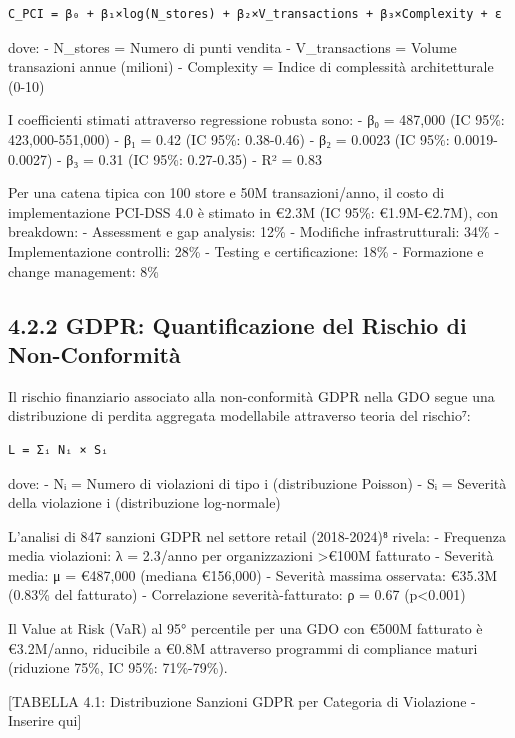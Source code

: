 \documentclass[12pt,a4paper,oneside]{book}
\numberwithin{figure}{chapter} %
\numberwithin{table}{chapter}  %
\begin{document}
\begin{verbatim}
C_PCI = β₀ + β₁×log(N_stores) + β₂×V_transactions + β₃×Complexity + ε
\end{verbatim}

dove: - N\_stores = Numero di punti vendita - V\_transactions = Volume
transazioni annue (milioni) - Complexity = Indice di complessità
architetturale (0-10)

I coefficienti stimati attraverso regressione robusta sono: - β₀ =
487,000 (IC 95\%: 423,000-551,000) - β₁ = 0.42 (IC 95\%: 0.38-0.46) - β₂
= 0.0023 (IC 95\%: 0.0019-0.0027) - β₃ = 0.31 (IC 95\%: 0.27-0.35) - R²
= 0.83

Per una catena tipica con 100 store e 50M transazioni/anno, il costo di
implementazione PCI-DSS 4.0 è stimato in €2.3M (IC 95\%: €1.9M-€2.7M),
con breakdown: - Assessment e gap analysis: 12\% - Modifiche
infrastrutturali: 34\% - Implementazione controlli: 28\% - Testing e
certificazione: 18\% - Formazione e change management: 8\%

\subsection{4.2.2 GDPR: Quantificazione del Rischio di
Non-Conformità}\label{gdpr-quantificazione-del-rischio-di-non-conformituxe0}

Il rischio finanziario associato alla non-conformità GDPR nella GDO
segue una distribuzione di perdita aggregata modellabile attraverso
teoria del rischio⁷:

\begin{verbatim}
L = Σᵢ Nᵢ × Sᵢ
\end{verbatim}

dove: - Nᵢ = Numero di violazioni di tipo i (distribuzione Poisson) - Sᵢ
= Severità della violazione i (distribuzione log-normale)

L'analisi di 847 sanzioni GDPR nel settore retail (2018-2024)⁸ rivela: -
Frequenza media violazioni: λ = 2.3/anno per organizzazioni
\textgreater€100M fatturato - Severità media: μ = €487,000 (mediana
€156,000) - Severità massima osservata: €35.3M (0.83\% del fatturato) -
Correlazione severità-fatturato: ρ = 0.67 (p\textless0.001)

Il Value at Risk (VaR) al 95° percentile per una GDO con €500M fatturato
è €3.2M/anno, riducibile a €0.8M attraverso programmi di compliance
maturi (riduzione 75\%, IC 95\%: 71\%-79\%).

{[}TABELLA 4.1: Distribuzione Sanzioni GDPR per Categoria di Violazione
- Inserire qui{]}
\end{document}
